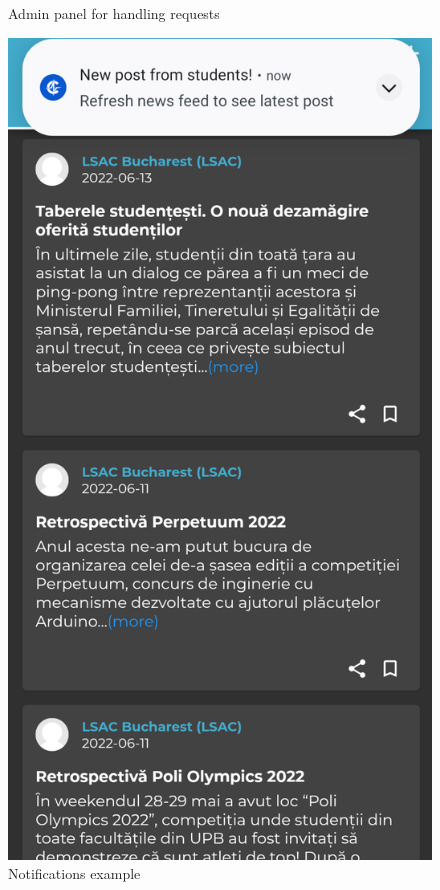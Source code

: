 \begin{figure}[!ht]
\begin{minipage}[b]{0.32\textwidth}
        \caption{Admin panel for handling requests}
        \label{4:fig:handle-requests}
    \end{minipage}
    \hfill
    \begin{minipage}[b]{0.32\textwidth}
        \captionsetup{justification=centering}
        \includegraphics[width=\textwidth]{figures/app/final/new-post-students-final.png}
        \caption{Notifications example}
        \label{4:fig:notifications-example}
    \end{minipage}
\end{figure}
